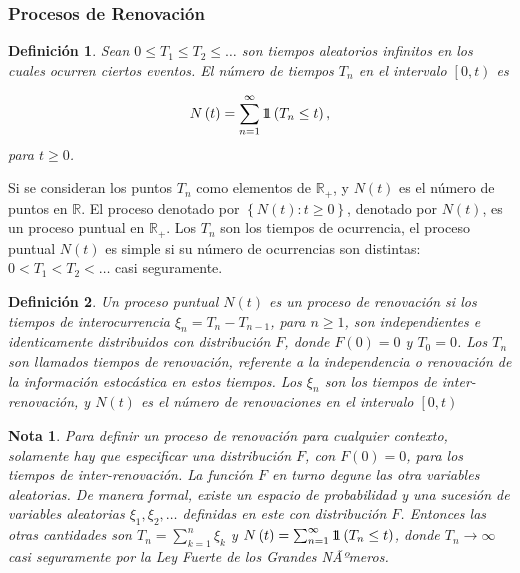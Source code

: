 \documentclass{article}
\newtheorem{Def}{Definición}
\newtheorem{Note}{Nota}
\newcommand{\rea}{\mathbb{R}}
\newcommand{\indora}{\mbox{$1$\hspace{-0.8ex}$1$}}
\begin{document}
\subsubsection{Procesos de Renovaci\'on}

\begin{Def}%
Sean $0\leq T_{1}\leq T_{2}\leq \ldots$ son tiempos aleatorios infinitos en los cuales ocurren ciertos eventos. El n\'umero de tiempos $T_{n}$ en el intervalo $\left[0,t\right)$ es

\begin{eqnarray}
N\left(t\right)=\sum_{n=1}^{\infty}\indora\left(T_{n}\leq t\right),
\end{eqnarray}
para $t\geq0$.
\end{Def}

Si se consideran los puntos $T_{n}$ como elementos de $\rea_{+}$, y $N\left(t\right)$ es el n\'umero de puntos en $\rea$. El proceso denotado por $\left\{N\left(t\right):t\geq0\right\}$, denotado por $N\left(t\right)$, es un proceso puntual en $\rea_{+}$. Los $T_{n}$ son los tiempos de ocurrencia, el proceso puntual $N\left(t\right)$ es simple si su n\'umero de ocurrencias son distintas: $0<T_{1}<T_{2}<\ldots$ casi seguramente.

\begin{Def}
Un proceso puntual $N\left(t\right)$ es un proceso de renovaci\'on si los tiempos de interocurrencia $\xi_{n}=T_{n}-T_{n-1}$, para $n\geq1$, son independientes e identicamente distribuidos con distribuci\'on $F$, donde $F\left(0\right)=0$ y $T_{0}=0$. Los $T_{n}$ son llamados tiempos de renovaci\'on, referente a la independencia o renovaci\'on de la informaci\'on estoc\'astica en estos tiempos. Los $\xi_{n}$ son los tiempos de inter-renovaci\'on, y $N\left(t\right)$ es el n\'umero de renovaciones en el intervalo $\left[0,t\right)$
\end{Def}


\begin{Note}
Para definir un proceso de renovaci\'on para cualquier contexto, solamente hay que especificar una distribuci\'on $F$, con $F\left(0\right)=0$, para los tiempos de inter-renovaci\'on. La funci\'on $F$ en turno degune las otra variables aleatorias. De manera formal, existe un espacio de probabilidad y una sucesi\'on de variables aleatorias $\xi_{1},\xi_{2},\ldots$ definidas en este con distribuci\'on $F$. Entonces las otras cantidades son $T_{n}=\sum_{k=1}^{n}\xi_{k}$ y $N\left(t\right)=\sum_{n=1}^{\infty}\indora\left(T_{n}\leq t\right)$, donde $T_{n}\rightarrow\infty$ casi seguramente por la Ley Fuerte de los Grandes NÃºmeros.
\end{Note}
\end{document}
